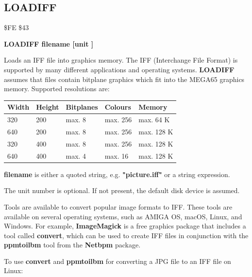 \subsection{LOADIFF}
\begin{description}[leftmargin=2cm,style=nextline]
\item [Token:] \$FE \$43
\item [Format:] {\bf LOADIFF filename [unit ]}
\item [Usage:]

   Loads an IFF file into graphics memory.
   The IFF (Interchange File Format) is supported by many different applications
   and operating systems. {\bf LOADIFF} assumes that files
   contain bitplane graphics which fit into the MEGA65 graphics memory.
   Supported resolutions are:
\begin{center}
{\ttfamily
\setlength{\tabcolsep}{1mm}
\begin{tabular}{|l|l|l|l|l|}
\hline
 Width             & Height & Bitplanes & Colours & Memory \\
\hline
320                     &  200    & max. 8     & max. 256 & max. 64 K \\
640                     &  200    & max. 8     & max. 256 & max. 128 K \\
320                     &  400    & max. 8     & max. 256 & max. 128 K \\
640                     &  400    & max. 4     & max.  16 & max. 128 K \\
\hline
\end{tabular}
}
\end{center}

   {\bf filename} is either a quoted string, e.g. {\bf "picture.iff"} or
   a string expression.

   The unit number is optional.
   If not present, the default disk device is assumed.

\item [Remarks:]
   Tools are available to convert popular image formats to IFF. These tools
   are available on several operating systems, such as AMIGA OS, macOS, Linux, and Windows.
   For example, {\bf ImageMagick} is a free graphics package that includes a tool
   called {\bf convert}, which can be used to create IFF files in conjunction
   with the {\bf ppmtoilbm} tool from the {\bf Netbpm} package.

To use {\bf convert} and {\bf ppmtoilbm} for converting a JPG file to an IFF file on Linux:


\end{description}
